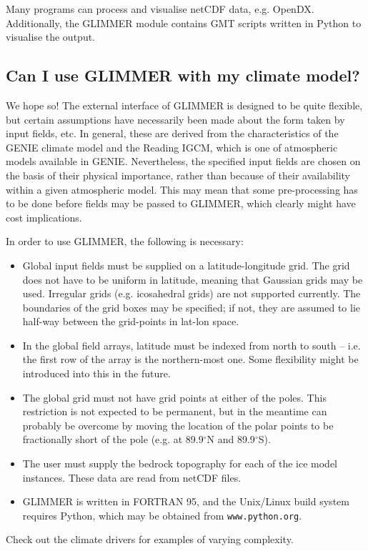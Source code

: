 Many programs can process and visualise netCDF data, e.g. OpenDX. Additionally, the GLIMMER module contains GMT scripts written in Python to visualise the output.

\subsection{Can I use GLIMMER with my climate model?}
We hope so! The external interface of GLIMMER is designed to be quite
flexible, but certain assumptions have necessarily been made about the form
taken by input fields, etc. In general, these are derived from the
characteristics of the GENIE climate model and the Reading IGCM, which is one
of atmospheric models available in GENIE. Nevertheless, the specified input
fields are chosen on the basis of their physical importance, rather than
because of their availability within a given atmospheric model. This may mean
that some pre-processing has to be done before fields may be passed to
GLIMMER, which clearly might have cost implications.

In order to use GLIMMER, the following is necessary:

\begin{itemize}
\item Global input fields must be supplied on a latitude-longitude
  grid. The grid does not have to be uniform in latitude, meaning that
  Gaussian grids may be used. Irregular grids (e.g. icosahedral grids) are not
  supported currently. The boundaries of the grid boxes may be specified; if
  not, they are assumed to lie half-way between the grid-points in lat-lon space.
\item In the global field arrays, latitude must be indexed from north to south
  -- i.e. the first row of the array is the northern-most one. Some
  flexibility might be introduced into this in the future.
\item The global grid must not have grid points at either of the poles. This
  restriction is not expected to be permanent, but in the meantime
  can probably be overcome by moving the location of the polar points to be
  fractionally short of the pole (e.g. at 89.9$^{\circ}$N and 89.9$^{\circ}$S).
\item The user must supply the bedrock topography for each of the ice model
  instances. These data are read from netCDF files.
\item GLIMMER is written in FORTRAN 95, and the Unix/Linux build system
  requires Python, which may be obtained from \texttt{www.python.org}. 
\end{itemize}

Check out the climate drivers for examples of varying complexity.
